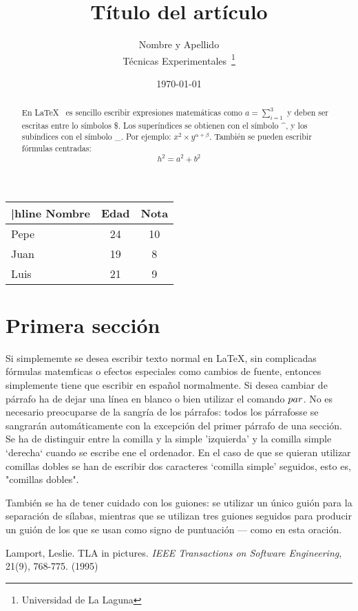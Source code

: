 \documentclass[a4paper,12pt]{article}
\begin{document}
\title{Título del artículo}
\author{Nombre y Apellido \\
Técnicas Experimentales~\footnote{Universidad de La Laguna}
}
\date{\today}
\maketitle

\begin{abstract}
En \LaTeX{}~\cite{Lam:86} es sencillo escribir expresiones
matemáticas como $a=\sum_{i=1}^{3}$
y deben ser escritas entre lo símbolos \$.
Los superíndices se obtienen con el símbolo \^{}, y
los subíndices con el símbolo \_.
Por ejemplo: $x^2 \times y^{\alpha + \beta}$.
También se pueden escribir fórmulas centradas:
\[h^2=a^2 + b^2 \]
\end{abstract}
\bigskip
\begin{tabular}{|l|c|c|}
|hline
Nombre & Edad & Nota \\ \hline
Pepe & 24 & 10 \\ \hline
Juan & 19 & 8 \\ \hline
Luis & 21 & 9 \\ \hline
\end{tabular}

\section{Primera sección}
Si simplememte se desea escribir texto normal en LaTeX,
sin complicadas f\'ormulas matem\'ticas o efectos especiales
como cambios de fuente, entonces simplemente tiene que escribir
en espa\~nol normalmente.
Si desea cambiar de párrafo ha de dejar una línea en blanco o bien
utilizar el comando $\\par$.
No es necesario preocuparse de la sangría de los párrafos:
todos los párrafosse se sangrarán automáticamente con la excepción
del primer párrafo de una sección.
Se ha de distinguir entre la comilla y la simple 'izquierda'
y la comilla simple `derecha` cuando se escribe ene el ordenador.
En el caso de que se quieran utilizar comillas dobles se han de
escribir dos caracteres `comilla simple' seguidos, esto es,
"comillas dobles". \par
También se ha de tener cuidado con los guiones: se utilizar un único
guión para la separación de sílabas, mientras que se utilizan
tres guiones seguidos para producir un guión de los que se usan
como signo de puntuación --- como en esta oración.
\begin{thebibliography}{00}
 Lamport, Leslie.
 TLA in pictures.
 \emph{IEEE Transactions on Software Engineering},
 21(9), 768-775.
 (1995)
 \end{thebibliography}
 
\end{document}
